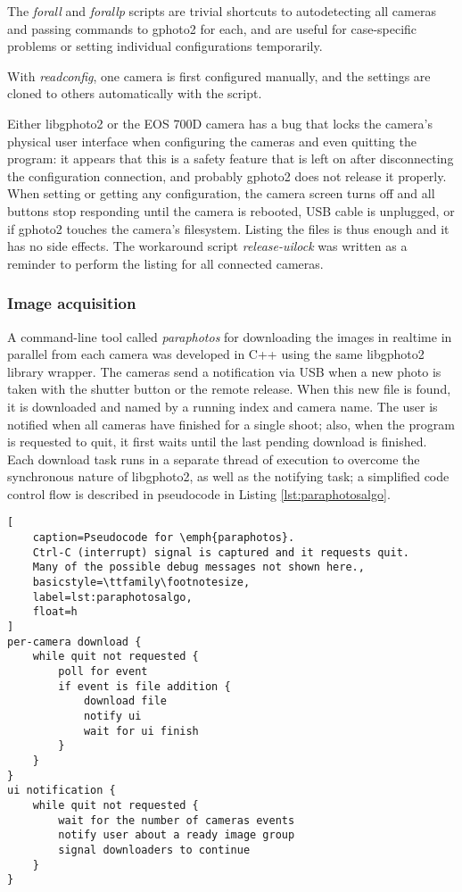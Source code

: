 The \emph{forall} and \emph{forallp} scripts are trivial shortcuts to autodetecting all cameras and passing commands to gphoto2 for each, and are useful for case-specific problems or setting individual configurations temporarily.

With \emph{readconfig}, one camera is first configured manually, and the settings are cloned to others automatically with the script.

Either libgphoto2 or the EOS 700D camera has a bug that locks the camera's physical user interface when configuring the cameras and even quitting the program:
it appears that this is a safety feature that is left on after disconnecting the configuration connection, and probably gphoto2 does not release it properly.
When setting or getting any configuration, the camera screen turns off and all buttons stop responding until the camera is rebooted, USB cable is unplugged, or if gphoto2 touches the camera's filesystem.
Listing the files is thus enough and it has no side effects.
The workaround script \emph{release-uilock} was written as a reminder to perform the listing for all connected cameras.


\subsubsection{Image acquisition} %


A command-line tool called \emph{paraphotos} for downloading the images in realtime in parallel from each camera was developed in C++ using the same libgphoto2 library wrapper.
The cameras send a notification via USB when a new photo is taken with the shutter button or the remote release.
When this new file is found, it is downloaded and named by a running index and camera name.
The user is notified when all cameras have finished for a single shoot;
also, when the program is requested to quit, it first waits until the last pending download is finished.
Each download task runs in a separate thread of execution to overcome the synchronous nature of libgphoto2, as well as the notifying task; a simplified code control flow is described in pseudocode in Listing \ref{lst:paraphotosalgo}.

\begin{lstlisting}[
	caption=Pseudocode for \emph{paraphotos}.
	Ctrl-C (interrupt) signal is captured and it requests quit.
	Many of the possible debug messages not shown here.,
	basicstyle=\ttfamily\footnotesize,
	label=lst:paraphotosalgo,
	float=h
]
per-camera download {
	while quit not requested {
		poll for event
		if event is file addition {
			download file
			notify ui
			wait for ui finish
		}
	}
}
ui notification {
	while quit not requested {
		wait for the number of cameras events
		notify user about a ready image group
		signal downloaders to continue
	}
}
\end{lstlisting}


